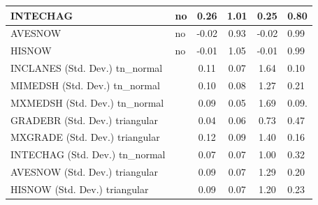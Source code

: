 \begin{table}
\begin{center}
\begin{tabular}{|l|l|c|c|c|l|}
			\hline
			INTECHAG & no & 0.26 & 1.01 & 0.25 & 0.80 \\
			\hline
			AVESNOW & no & -0.02 & 0.93 & -0.02 & 0.99 \\
			\hline
			HISNOW & no & -0.01 & 1.05 & -0.01 & 0.99 \\
			\hline
			INCLANES (Std. Dev.) tn_normal &  & 0.11 & 0.07 & 1.64 & 0.10 \\
			\hline
			MIMEDSH (Std. Dev.) tn_normal &  & 0.10 & 0.08 & 1.27 & 0.21 \\
			\hline
			MXMEDSH (Std. Dev.) tn_normal &  & 0.09 & 0.05 & 1.69 & 0.09. \\
			\hline
			GRADEBR (Std. Dev.) triangular &  & 0.04 & 0.06 & 0.73 & 0.47 \\
			\hline
			MXGRADE (Std. Dev.) triangular &  & 0.12 & 0.09 & 1.40 & 0.16 \\
			\hline
			INTECHAG (Std. Dev.) tn_normal &  & 0.07 & 0.07 & 1.00 & 0.32 \\
			\hline
			AVESNOW (Std. Dev.) triangular &  & 0.09 & 0.07 & 1.29 & 0.20 \\
			\hline
			HISNOW (Std. Dev.) triangular &  & 0.09 & 0.07 & 1.20 & 0.23 \\
			\hline
		\end{tabular}
	\end{center}
\end{table}